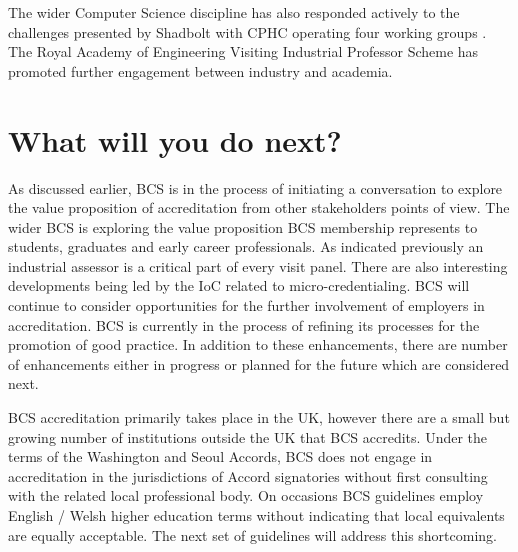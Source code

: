 \documentclass[sigconf]{acmart}
\begin{document}
The wider Computer Science discipline has also responded actively to the challenges presented by Shadbolt with CPHC operating four working groups \cite{cphc_2016}.  The Royal Academy of Engineering Visiting Industrial Professor Scheme \cite{royal} has promoted further engagement between industry and academia.

\section {What will you do next?}	
As discussed earlier,  BCS is in the process of initiating a conversation to explore the value proposition of accreditation from other stakeholders points of view. The wider BCS is exploring the value proposition BCS membership represents to students, graduates and early career professionals. As indicated previously an industrial assessor is a critical part of every visit panel. There are also interesting developments being led by the IoC related to micro-credentialing. BCS will continue to consider opportunities for the further involvement of employers in accreditation. BCS is currently in the process of refining its processes for the promotion of good practice. In addition to these enhancements, there are number of enhancements either in progress or planned for the future which are considered next.

BCS accreditation primarily takes place in the UK, however there are a small but growing number of institutions outside the UK that BCS accredits. Under the terms of the Washington and Seoul Accords, BCS does not engage in accreditation in the jurisdictions of Accord signatories without first consulting with the related local professional body.  On occasions BCS guidelines employ English / Welsh higher education terms without indicating that local equivalents are equally acceptable. The next set of guidelines will address this shortcoming.
\end{document}
